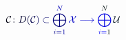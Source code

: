 \documentclass[12pt]{article}
\begin{document}
\makeatletter
\renewcommand*{\@textcolor}[3]{%
  \protect\leavevmode
  \begingroup
    \color#1{#2}#3%
  \endgroup
}
\makeatother
\begin{displaymath}
\displaystyle \mathcal { \mathcolor[RGB]{0,0,15}{C} } \mathcolor[RGB]{0,0,30}{\colon} \mathcolor[RGB]{0,0,45}{D} \mathcolor[RGB]{0,0,60}{(} \mathcal { \mathcolor[RGB]{0,0,75}{C} } \mathcolor[RGB]{0,0,90}{)} \mathcolor[RGB]{0,0,105}{\subset} \mathcolor[RGB]{0,0,120}{\bigoplus} _ { \mathcolor[RGB]{0,0,135}{i} \mathcolor[RGB]{0,0,150}{=} \mathcolor[RGB]{0,0,165}{1} } ^ { \mathcolor[RGB]{0,0,180}{N} } \mathcal { \mathcolor[RGB]{0,0,195}{X} } \mathcolor[RGB]{0,0,210}{\longrightarrow} \mathcolor[RGB]{0,0,225}{\bigoplus} _ { \mathcolor[RGB]{0,0,240}{i} \mathcolor[RGB]{0,0,255}{=} \mathcolor[RGB]{0,15,0}{1} } ^ { \mathcolor[RGB]{0,15,15}{N} } \mathcal { \mathcolor[RGB]{0,15,30}{U} }
\end{displaymath}
\end{document}
